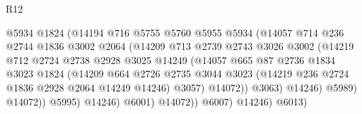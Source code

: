 \begin{lexlean}{R12}
\begin{coremodule}
                                    @5934
                                    @1824
                                    (@14194
                                      @716
                                      @5755
                                      @5760
                                      @5955
                                      @5934
                                      (@14057
                                        @714
                                        @236
                                        @2744
                                        @1836
                                        @3002
                                        @2064
                                        (@14209
                                          @713
                                          @2739
                                          @2743
                                          @3026
                                          @3002
                                          (@14219
                                            @712
                                            @2724
                                            @2738
                                            @2928
                                            @3025
                                            @14249
                                            (@14057
                                              @665
                                              @87
                                              @2736
                                              @1834
                                              @3023
                                              @1824
                                              (@14209
                                                @664
                                                @2726
                                                @2735
                                                @3044
                                                @3023
                                                (@14219 @236 @2724 @1836 @2928 @2064 @14249 @14246)
                                                @3057)
                                              @14072))
                                          @3063)
                                        @14246)
                                      @5989)
                                    @14072))
                                @5995)
                              @14246)
                            @6001)
                          @14072))
                      @6007)
                    @14246)
                  @6013)

\end{coremodule}
\end{lexlean}
